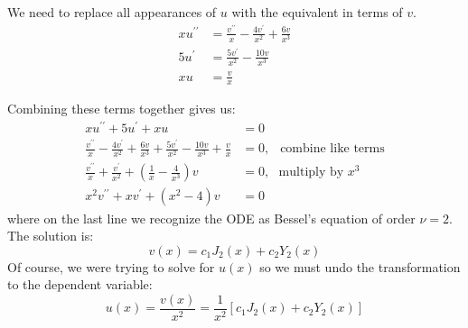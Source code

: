We need to replace all appearances of $u$ with the equivalent in terms of $v$.
\begin{align*}
xu^{\prime \prime} &= \frac{v^{\prime \prime}}{x} - \frac{4v^{\prime}}{x^2} + \frac{6v}{x^3} \\
5u^{\prime} &= \frac{5v^{\prime}}{x^2} - \frac{10v}{x^{3}} \\
xu &= \frac{v}{x}
\end{align*}

Combining these terms together gives us:
\begin{align*}
xu^{\prime \prime} + 5u^{\prime} + xu &= 0 \\
\frac{v^{\prime \prime}}{x} - \frac{4v^{\prime}}{x^2} + \frac{6v}{x^3} + \frac{5v^{\prime}}{x^2} - \frac{10v}{x^{3}} + \frac{v}{x} &= 0, \ \ \text{ combine like terms}\\
\frac{v^{\prime \prime}}{x}+\frac{v^{\prime}}{x^2} + \left(\frac{1}{x}-\frac{4}{x^3} \right)v &= 0, \ \ \ \text{multiply by }x^3 \\
x^2v^{\prime \prime} + xv^{\prime} + \left(x^2 - 4 \right)v &= 0
\end{align*}
where on the last line we recognize the ODE as Bessel's equation of order $\nu = 2$.  The solution is:
\begin{equation*}
v(x) = c_1J_2(x) + c_2Y_2(x)
\end{equation*}
Of course, we were trying to solve for $u(x)$ so we must undo the transformation to the dependent variable:
\begin{equation*}
u(x) = \frac{v(x)}{x^2} = \frac{1}{x^2}\left[ c_1J_2(x) + c_2Y_2(x)\right]
\end{equation*}

\vspace{1.0cm}


